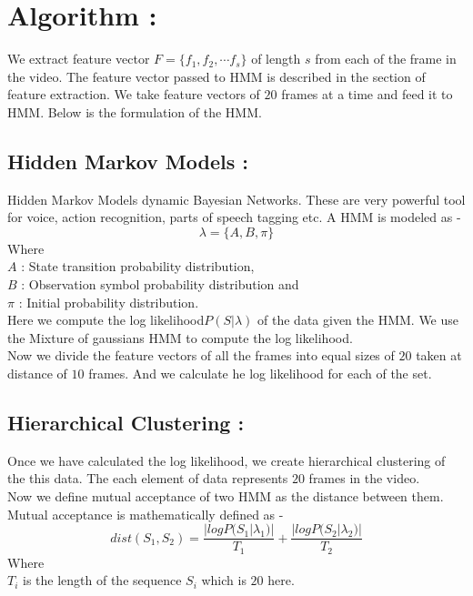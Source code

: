 \documentclass[11pt, twocolumn]{article}
\begin{document}
\section*{Algorithm :} We extract feature vector $F =  \{f_1, f_2, \cdots f_s \}$ of length $s$ from each of the  frame in the video. The feature vector passed to HMM is described in the section of feature extraction. We take feature vectors of $20$ frames at a time and feed it to HMM. Below is the formulation of the HMM.\\
\subsection*{Hidden Markov Models :}
	Hidden Markov Models dynamic Bayesian Networks. These are very powerful tool for voice, action recognition\cite{Rabiner89atutorial}, parts of speech tagging etc. A HMM is modeled as  - 
	$$\lambda = \{ A, B, \pi \}$$ 
	Where \\
	\hspace*{30pt} $A$ : State transition probability distribution,\\
	\hspace*{30pt} $B$ : Observation symbol probability distribution and \\
	\hspace*{30pt} $\pi$ : Initial probability distribution.\\ 

Here we compute the log likelihood$P(S|\lambda)$ of the data given the HMM. We use the Mixture of gaussians HMM to compute the log likelihood.\\
Now we divide the feature vectors of all the frames into equal sizes of $20$ taken at distance of $10$ frames. And we calculate he log likelihood for each of the set.\\
\subsection*{Hierarchical Clustering :}
Once we have calculated the log likelihood, we create hierarchical clustering of the this data. The each element of data represents $20$ frames in the video.\\
Now we define mutual acceptance of two HMM as the distance between them. Mutual acceptance is mathematically defined as - \\
$$dist(S_1, S_2) = \frac{|logP(S_1|\lambda _ 1)|}{T_1} +\frac{|logP(S_2|\lambda _ 2)|}{T_2} $$
Where\\
\hspace*{30pt} $T_i$ is the length of the sequence $S_i$ which is $20$ here.\\
\end{document}
